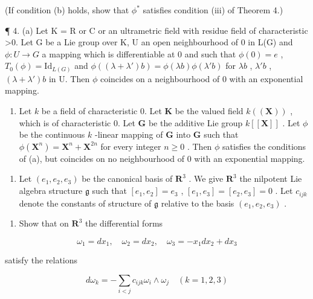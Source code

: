 (If condition (b) holds, show that \(\phi^{*}\) satisfies condition (iii) of Theorem 4.)

¶ 4. (a) Let K = R or C or an ultrametric field with residue field of characteristic \textgreater0. Let G be a Lie group over K, U an open neighbourhood of 0 in L(G) and \(\phi: U \to G\) a mapping which is differentiable at 0 and such
that \(\phi(0) = e\) , \(T_0(\phi) = \mathrm{Id}_{L(G)}\) and \(\phi((\lambda + \lambda')b) = \phi(\lambda b)\phi(\lambda'b)\) for \(\lambda b\) , \(\lambda'b\) , \((\lambda + \lambda')b\) in U. Then \(\phi\) coincides on a neighbourhood of 0 with an exponential mapping.

\begin{enumerate}
\def\labelenumi{(\alph{enumi})}
\setcounter{enumi}{1}
\tightlist
\item
  Let \(k\) be a field of characteristic 0. Let \(\mathbf{K}\) be the valued field \(k((\mathbf{X}))\) , which is of characteristic 0. Let \(\mathbf{G}\) be the additive Lie group \(k[[\mathbf{X}]]\) . Let \(\phi\) be the continuous \(k\) -linear mapping of \(\mathbf{G}\) into \(\mathbf{G}\) such that \(\phi(\mathbf{X}^n) = \mathbf{X}^n + \mathbf{X}^{2n}\) for every integer \(n \geqslant 0\) . Then \(\phi\) satisfies the conditions of (a), but coincides on no neighbourhood of 0 with an exponential mapping.
\end{enumerate}

\begin{enumerate}
\def\labelenumi{\arabic{enumi}.}
\setcounter{enumi}{4}
\tightlist
\item
  Let \((e_1, e_2, e_3)\) be the canonical basis of \(\mathbf{R}^3\) . We give \(\mathbf{R}^3\) the nilpotent Lie algebra structure \(\mathfrak{g}\) such that \([e_1, e_2] = e_3\) , \([e_1, e_3] = [e_2, e_3] = 0\) . Let \(c_{ijk}\) denote the constants of structure of \(\mathfrak{g}\) relative to the basis \((e_1, e_2, e_3)\) .
\end{enumerate}

\begin{enumerate}
\def\labelenumi{(\alph{enumi})}
\tightlist
\item
  Show that on \(\mathbf{R}^3\) the differential forms
\end{enumerate}

\[
\omega_ {1} = d x _ {1}, \quad \omega_ {2} = d x _ {2}, \quad \omega_ {3} = - x _ {1} d x _ {2} + d x _ {3}
\]

satisfy the relations

\[
d \omega_ {k} = - \sum_ {i <   j} c _ {i j k} \omega_ {i} \wedge \omega_ {j} \quad (k = 1, 2, 3)
\]

